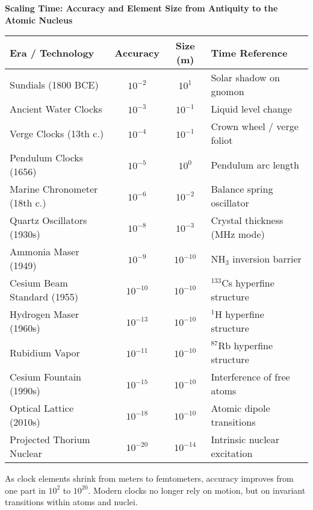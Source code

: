 \begin{historical}
\textbf{Scaling Time: Accuracy and Element Size from Antiquity to the Atomic Nucleus}

\vspace{1em}
\begin{tabular}{p{4.5cm} c c l}
\textbf{Era / Technology} & \textbf{Accuracy} & \textbf{Size (m)} & \textbf{Time Reference} \\ \hline
Sundials (1800 BCE) & $10^{-2}$ & $10^1$ & Solar shadow on gnomon \\
Ancient Water Clocks & $10^{-3}$ & $10^{-1}$ & Liquid level change \\
Verge Clocks (13th c.) & $10^{-4}$ & $10^{-1}$ & Crown wheel / verge foliot \\
Pendulum Clocks (1656) & $10^{-5}$ & $10^0$ & Pendulum arc length \\
Marine Chronometer (18th c.) & $10^{-6}$ & $10^{-2}$ & Balance spring oscillator \\
Quartz Oscillators (1930s) & $10^{-8}$ & $10^{-3}$ & Crystal thickness (MHz mode) \\
Ammonia Maser (1949) & $10^{-9}$ & $10^{-10}$ & NH$_3$ inversion barrier \\
Cesium Beam Standard (1955) & $10^{-10}$ & $10^{-10}$ & $^{133}$Cs hyperfine structure \\
Hydrogen Maser (1960s) & $10^{-13}$ & $10^{-10}$ & $^{1}$H hyperfine structure \\
Rubidium Vapor & $10^{-11}$ & $10^{-10}$ & $^{87}$Rb hyperfine structure \\
Cesium Fountain (1990s) & $10^{-15}$ & $10^{-10}$ & Interference of free atoms \\
Optical Lattice (2010s) & $10^{-18}$ & $10^{-10}$ & Atomic dipole transitions \\
Projected Thorium Nuclear & $10^{-20}$ & $10^{-14}$ & Intrinsic nuclear excitation \\
\end{tabular}

\vspace{1em}
As clock elements shrink from meters to femtometers, accuracy improves from one part in $10^2$ to $10^{20}$. Modern clocks no longer rely on motion, but on invariant transitions within atoms and nuclei.
\end{historical}
